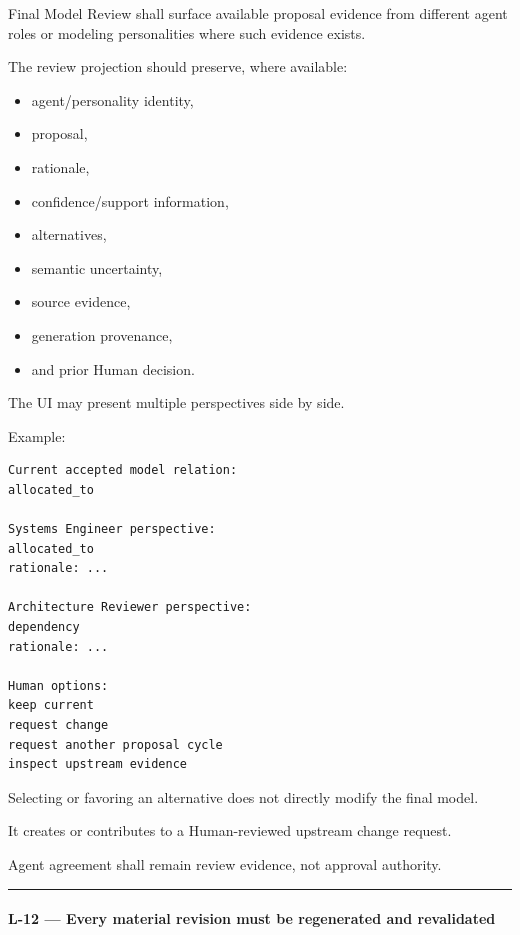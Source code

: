 Final Model Review shall surface available proposal evidence from different agent roles or modeling personalities where such evidence exists.

The review projection should preserve, where available:

\begin{itemize}
\tightlist
\item
  agent/personality identity,
\item
  proposal,
\item
  rationale,
\item
  confidence/support information,
\item
  alternatives,
\item
  semantic uncertainty,
\item
  source evidence,
\item
  generation provenance,
\item
  and prior Human decision.
\end{itemize}

The UI may present multiple perspectives side by side.

Example:

\begin{verbatim}
Current accepted model relation:
allocated_to

Systems Engineer perspective:
allocated_to
rationale: ...

Architecture Reviewer perspective:
dependency
rationale: ...

Human options:
keep current
request change
request another proposal cycle
inspect upstream evidence
\end{verbatim}

Selecting or favoring an alternative does not directly modify the final model.

It creates or contributes to a Human-reviewed upstream change request.

Agent agreement shall remain review evidence, not approval authority.

\begin{center}\rule{0.5\linewidth}{0.5pt}\end{center}

\hypertarget{l-12--every-material-revision-must-be-regenerated-and-revalidated}{%
\paragraph{L-12 --- Every material revision must be regenerated and revalidated}\label{l-12--every-material-revision-must-be-regenerated-and-revalidated}}

